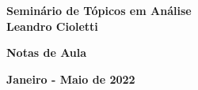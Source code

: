 %
%
%
\begin{titlepage}			%

\begin{center}				%

	{\fontsize{16mm}{11mm}
		\selectfont
		\textbf{Seminário de Tópicos em Análise}}
		\\[0.5cm]
	{\fontsize{8mm}{8mm}\selectfont
		\textbf{Leandro Cioletti}
		}

	\vspace{80mm}				%


	{\fontsize{14pt}{14pt}\selectfont
		\textbf{Notas de Aula}
		}
	
	\vspace{7pt}				%


	{\fontsize{14pt}{14pt}\selectfont
		\textbf{Janeiro - Maio de 2022}
		}
	
	\vfill						%


	\vspace{10mm}				%
	\begin{figure}[h]            %
		\centering
	\end{figure} 

\end{center}
\end{titlepage}
